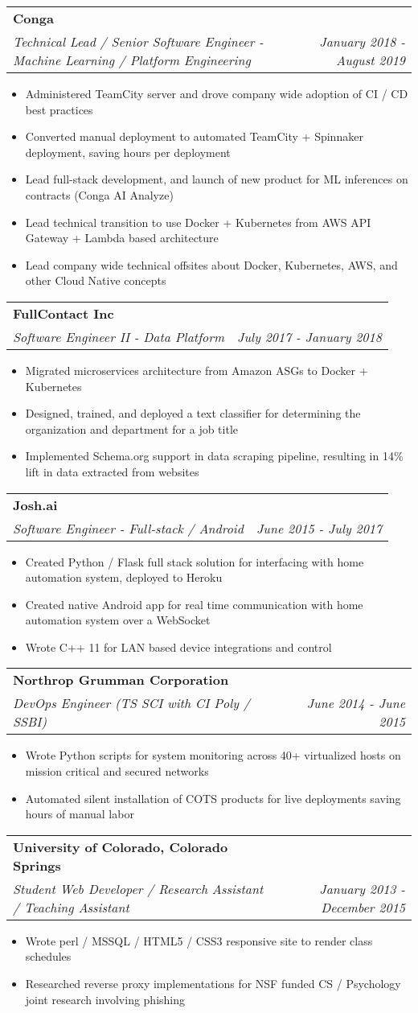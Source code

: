 \documentclass[letterpaper,11pt]{article}
\makeatletter
\newcommand{\resumeItemNoBold}[1]{
  \item\small{
    {#1 \vspace{-2pt}}
  }
}
\newcommand{\resumeSubheading}[3]{
  \vspace{-1pt}\item
    \begin{tabular*}{0.97\textwidth}{l@{\extracolsep{\fill}}r}
      \textbf{#1} \\
      \textit{\small#2} & \textit{\small #3} \\
    \end{tabular*}\vspace{-5pt}
}
\newcommand{\resumeItemListStart}{\begin{itemize}}
\newcommand{\resumeItemListEnd}{\end{itemize}\vspace{-5pt}}
\makeatother
\begin{document}
    \resumeSubheading
      {Conga}
      {Technical Lead / Senior Software Engineer - Machine Learning / Platform Engineering}{January
        2018 - August 2019}
      \resumeItemListStart
        \resumeItemNoBold {Administered TeamCity server and drove company wide adoption of CI / CD best practices}
        \resumeItemNoBold {Converted manual deployment to automated TeamCity + Spinnaker deployment, saving hours per deployment}
        \resumeItemNoBold {Lead full-stack development, and launch of new product for ML inferences on contracts (Conga AI Analyze)}
        \resumeItemNoBold {Lead technical transition to use Docker + Kubernetes from AWS API Gateway + Lambda based architecture}
        \resumeItemNoBold {Lead company wide technical offsites about Docker, Kubernetes, AWS, and other Cloud Native concepts}
      \resumeItemListEnd

    \resumeSubheading
      {FullContact Inc}
      {Software Engineer II - Data Platform}{July 2017 - January 2018}
      \resumeItemListStart
        \resumeItemNoBold {Migrated microservices architecture from Amazon ASGs to Docker + Kubernetes}
        \resumeItemNoBold {Designed, trained, and deployed a text classifier for determining the organization and department for a job title}
        \resumeItemNoBold {Implemented Schema.org support in data scraping pipeline, resulting in 14\% lift in data extracted from websites}
      \resumeItemListEnd

    \resumeSubheading
      {Josh.ai}
      {Software Engineer - Full-stack / Android}{June 2015 - July 2017}
      \resumeItemListStart
        \resumeItemNoBold{Created Python / Flask full stack solution for interfacing with home automation system, deployed to Heroku}
        \resumeItemNoBold{Created native Android app for real time communication with home automation system over a WebSocket}
        \resumeItemNoBold{Wrote C++ 11 for LAN based device integrations and control}
      \resumeItemListEnd

    \resumeSubheading
      {Northrop Grumman Corporation}
      {DevOps Engineer (TS SCI with CI Poly / SSBI)}{June 2014 - June 2015}
      \resumeItemListStart
        \resumeItemNoBold{Wrote Python scripts for system monitoring across 40+ virtualized hosts on mission critical and secured networks}
        \resumeItemNoBold{Automated silent installation of COTS products for live deployments saving hours of manual labor}
      \resumeItemListEnd

    \resumeSubheading
      {University of Colorado, Colorado Springs}
      {Student Web Developer / Research Assistant / Teaching Assistant}{January
      2013 - December 2015}
      \resumeItemListStart
        \resumeItemNoBold{Wrote perl / MSSQL / HTML5 / CSS3 responsive site to render class schedules}
        \resumeItemNoBold{Researched reverse proxy implementations for NSF funded CS / Psychology joint research involving phishing}
      \resumeItemListEnd
\end{document}
